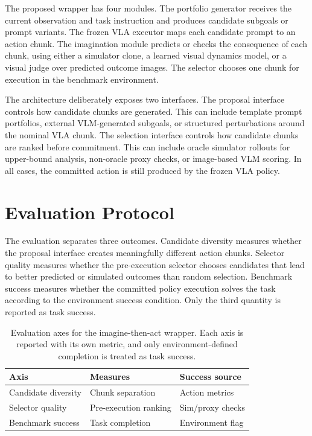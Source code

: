 \documentclass[conference]{IEEEtran}
\begin{document}
The proposed wrapper has four modules. The portfolio generator receives the
current observation and task instruction and produces candidate subgoals or
prompt variants. The frozen VLA executor maps each candidate prompt to an
action chunk. The imagination module predicts or checks the consequence of
each chunk, using either a simulator clone, a learned visual dynamics model, or
a visual judge over predicted outcome images. The selector chooses one chunk
for execution in the benchmark environment.

The architecture deliberately exposes two interfaces. The proposal interface
controls how candidate chunks are generated. This can include template prompt
portfolios, external VLM-generated subgoals, or structured perturbations around
the nominal VLA chunk. The selection interface controls how candidate chunks
are ranked before commitment. This can include oracle simulator rollouts for
upper-bound analysis, non-oracle proxy checks, or image-based VLM scoring. In
all cases, the committed action is still produced by the frozen VLA policy.

\section{Evaluation Protocol}

The evaluation separates three outcomes. Candidate diversity measures whether
the proposal interface creates meaningfully different action chunks. Selector
quality measures whether the pre-execution selector chooses candidates that
lead to better predicted or simulated outcomes than random selection.
Benchmark success measures whether the committed policy execution solves the
task according to the environment success condition. Only the third quantity is
reported as task success.

\begin{table}[t]
\centering
\caption{Evaluation axes for the imagine-then-act wrapper. Each axis is
reported with its own metric, and only environment-defined completion is
treated as task success.}
\label{tab:evaluation_axes}
\begin{tabular}{lll}
\toprule
Axis & Measures & Success source \\
\midrule
Candidate diversity & Chunk separation & Action metrics \\
Selector quality & Pre-execution ranking & Sim/proxy checks \\
Benchmark success & Task completion & Environment flag \\
\bottomrule
\end{tabular}
\end{table}
\end{document}
